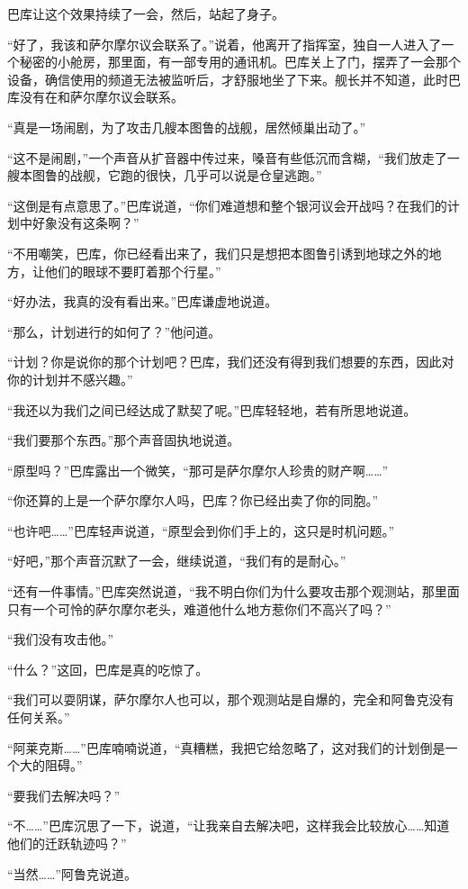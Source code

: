 巴库让这个效果持续了一会，然后，站起了身子。 

“好了，我该和萨尔摩尔议会联系了。”说着，他离开了指挥室，独自一人进入了一个秘密的小舱房，那里面，有一部专用的通讯机。巴库关上了门，摆弄了一会那个设备，确信使用的频道无法被监听后，才舒服地坐了下来。舰长并不知道，此时巴库没有在和萨尔摩尔议会联系。 

“真是一场闹剧，为了攻击几艘本图鲁的战舰，居然倾巢出动了。” 

“这不是闹剧，”一个声音从扩音器中传过来，嗓音有些低沉而含糊，“我们放走了一艘本图鲁的战舰，它跑的很快，几乎可以说是仓皇逃跑。” 

“这倒是有点意思了。”巴库说道，“你们难道想和整个银河议会开战吗？在我们的计划中好象没有这条啊？” 

“不用嘲笑，巴库，你已经看出来了，我们只是想把本图鲁引诱到地球之外的地方，让他们的眼球不要盯着那个行星。” 

“好办法，我真的没有看出来。”巴库谦虚地说道。 

“那么，计划进行的如何了？”他问道。 

“计划？你是说你的那个计划吧？巴库，我们还没有得到我们想要的东西，因此对你的计划并不感兴趣。” 

“我还以为我们之间已经达成了默契了呢。”巴库轻轻地，若有所思地说道。 

“我们要那个东西。”那个声音固执地说道。 

“原型吗？”巴库露出一个微笑，“那可是萨尔摩尔人珍贵的财产啊……” 

“你还算的上是一个萨尔摩尔人吗，巴库？你已经出卖了你的同胞。” 

“也许吧……”巴库轻声说道，“原型会到你们手上的，这只是时机问题。” 

“好吧，”那个声音沉默了一会，继续说道，“我们有的是耐心。” 

“还有一件事情。”巴库突然说道，“我不明白你们为什么要攻击那个观测站，那里面只有一个可怜的萨尔摩尔老头，难道他什么地方惹你们不高兴了吗？” 

“我们没有攻击他。” 

“什么？”这回，巴库是真的吃惊了。 

“我们可以耍阴谋，萨尔摩尔人也可以，那个观测站是自爆的，完全和阿鲁克没有任何关系。” 

“阿莱克斯……”巴库喃喃说道，“真糟糕，我把它给忽略了，这对我们的计划倒是一个大的阻碍。” 

“要我们去解决吗？” 

“不……”巴库沉思了一下，说道，“让我亲自去解决吧，这样我会比较放心……知道他们的迁跃轨迹吗？” 

“当然……”阿鲁克说道。 

